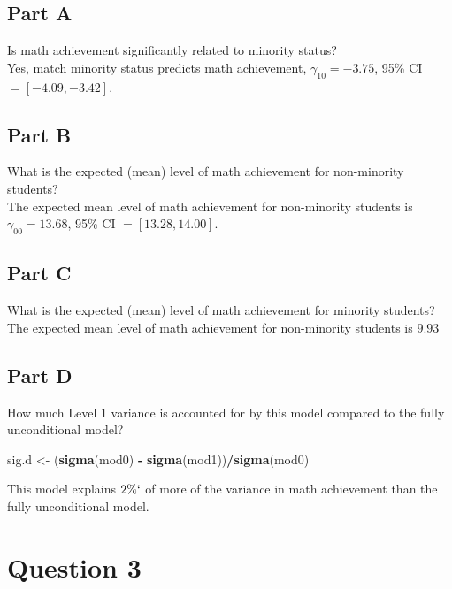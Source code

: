 \documentclass[]{article}
\newenvironment{Shaded}{\begin{snugshade}}{\end{snugshade}}
\newcommand{\KeywordTok}[1]{\textcolor[rgb]{0.13,0.29,0.53}{\textbf{#1}}}
\newcommand{\StringTok}[1]{\textcolor[rgb]{0.31,0.60,0.02}{#1}}
\newcommand{\OperatorTok}[1]{\textcolor[rgb]{0.81,0.36,0.00}{\textbf{#1}}}
\newcommand{\NormalTok}[1]{#1}
\begin{document}
\subsection{Part A}\label{part-a}

Is math achievement significantly related to minority status?\\
Yes, match minority status predicts math achievement,
\(\gamma_{10} = -3.75\), 95\% CI \(= [-4.09, -3.42]\).

\subsection{Part B}\label{part-b}

What is the expected (mean) level of math achievement for non-minority
students?\\
The expected mean level of math achievement for non-minority students is
\(\gamma_{00} = 13.68\), 95\% CI \(= [13.28, 14.00]\).

\subsection{Part C}\label{part-c}

What is the expected (mean) level of math achievement for minority
students?\\
The expected mean level of math achievement for non-minority students is
\(9.93\)

\subsection{Part D}\label{part-d}

How much Level 1 variance is accounted for by this model compared to the
fully unconditional model?

\begin{Shaded}
\begin{Highlighting}[]
\NormalTok{sig.d <-}\StringTok{ }\NormalTok{(}\KeywordTok{sigma}\NormalTok{(mod0) }\OperatorTok{-}\StringTok{ }\KeywordTok{sigma}\NormalTok{(mod1))}\OperatorTok{/}\KeywordTok{sigma}\NormalTok{(mod0)}
\end{Highlighting}
\end{Shaded}

This model explains \(2\%`\) of more of the variance in math achievement
than the fully unconditional model.

\section{Question 3}\label{question-3}
\end{document}
